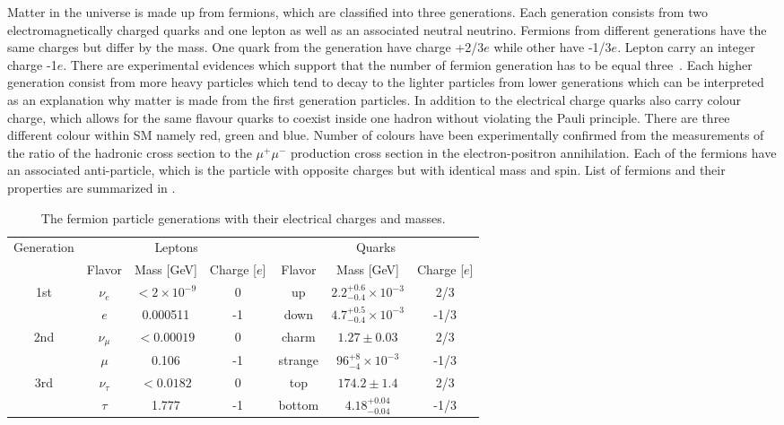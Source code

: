 Matter in the universe is made up from fermions, which are classified into three generations.
Each generation consists from two electromagnetically charged quarks and one lepton as well as an associated neutral neutrino.
Fermions from different generations have the same charges but differ by the mass.
One quark from the generation have charge +2/3$e$ while other have -1/3$e$. Lepton carry an integer charge -1$e$.
There are experimental evidences which support that the number of fermion generation has to be equal three~\cite{three_lepton_generations}.
Each higher generation consist from more heavy particles which tend to decay to the lighter particles from lower generations which can be
interpreted as an explanation why matter is made from the first generation particles.
In addition to the electrical charge quarks also carry colour charge, 
which allows for the same flavour quarks to coexist inside one hadron without violating the Pauli principle.
There are three different colour within SM namely red, green and blue.
Number of colours have been experimentally confirmed from the measurements of the ratio of the hadronic cross section 
to the $\mu^+\mu^-$ production cross section in the electron-positron annihilation. 
Each of the fermions have an associated anti-particle, which is the particle with opposite charges but with identical mass and spin.
List of fermions and their properties are summarized in .

\begin{table*}[!ht]
\begin{center}
\begin{tabular}{c||c|c|c||c|c|c}
\multirow{2}{*}{Generation} & \multicolumn{3}{c||}{Leptons} & \multicolumn{3}{c}{Quarks} \\
\cline{2-7}
 & Flavor & Mass [GeV] & Charge [$e$] &  Flavor & Mass [GeV] & Charge [$e$] \\
\hline
\multirow{2}{*}{1st} & $\nu_e$ & $<2\times10^{-9}$ & 0 & up & $2.2^{+0.6}_{-0.4}\times10^{-3}$ & 2/3 \\
 & $e$ & 0.000511 & -1 & down & $4.7^{+0.5}_{-0.4}\times10^{-3}$ & -1/3 \\
\cline{1-7} 
\multirow{2}{*}{2nd} & $\nu_{\mu}$ & $<0.00019$ & 0 & charm & $1.27\pm0.03$ & 2/3 \\
 & $\mu$ & 0.106 & -1 & strange & $96^{+8}_{-4}\times10^{-3}$ & -1/3 \\
\cline{1-7}
\multirow{2}{*}{3rd} & $\nu_{\tau}$ & $<0.0182$ & 0 & top & $174.2\pm1.4$ & 2/3 \\
 & $\tau$ & 1.777 & -1 & bottom & $4.18^{+0.04}_{-0.04}$ & -1/3 \\
\end{tabular}
\end{center}
 \caption{The fermion particle generations with their electrical charges and masses.}
\label{tab:fermions}
\end{table*}

